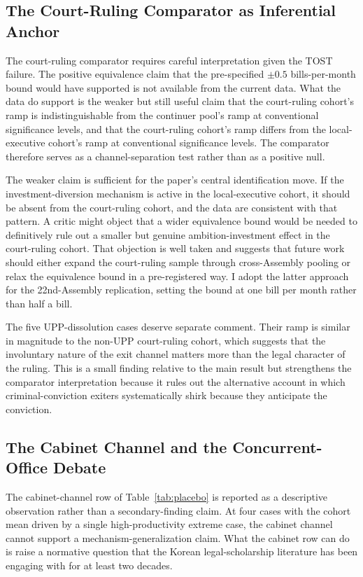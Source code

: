 \documentclass[11pt]{article}
\begin{document}
\subsection{The Court-Ruling Comparator as Inferential Anchor}

The court-ruling comparator requires careful interpretation given the TOST failure. The positive equivalence claim that the pre-specified $\pm 0.5$ bills-per-month bound would have supported is not available from the current data. What the data do support is the weaker but still useful claim that the court-ruling cohort's ramp is indistinguishable from the continuer pool's ramp at conventional significance levels, and that the court-ruling cohort's ramp differs from the local-executive cohort's ramp at conventional significance levels. The comparator therefore serves as a channel-separation test rather than as a positive null.

The weaker claim is sufficient for the paper's central identification move. If the investment-diversion mechanism is active in the local-executive cohort, it should be absent from the court-ruling cohort, and the data are consistent with that pattern. A critic might object that a wider equivalence bound would be needed to definitively rule out a smaller but genuine ambition-investment effect in the court-ruling cohort. That objection is well taken and suggests that future work should either expand the court-ruling sample through cross-Assembly pooling or relax the equivalence bound in a pre-registered way. I adopt the latter approach for the 22nd-Assembly replication, setting the bound at one bill per month rather than half a bill.

The five UPP-dissolution cases deserve separate comment. Their ramp is similar in magnitude to the non-UPP court-ruling cohort, which suggests that the involuntary nature of the exit channel matters more than the legal character of the ruling. This is a small finding relative to the main result but strengthens the comparator interpretation because it rules out the alternative account in which criminal-conviction exiters systematically shirk because they anticipate the conviction.

\subsection{The Cabinet Channel and the Concurrent-Office Debate}

The cabinet-channel row of Table~\ref{tab:placebo} is reported as a descriptive observation rather than a secondary-finding claim. At four cases with the cohort mean driven by a single high-productivity extreme case, the cabinet channel cannot support a mechanism-generalization claim. What the cabinet row can do is raise a normative question that the Korean legal-scholarship literature has been engaging with for at least two decades.
\end{document}
